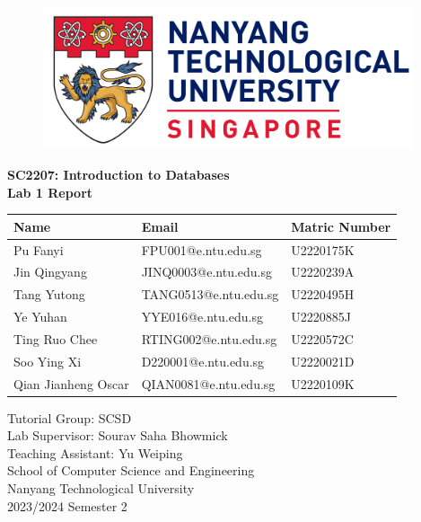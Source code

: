 \begin{titlepage}
	\begin{figure}[!t]
		\centering
		\includegraphics[width = 4.3in]{title/logo.pdf}
		\caption*{}
	\end{figure}
	
	\centering
	\LARGE{\textbf{SC2207: Introduction to Databases}}\\[0.2in]
	\LARGE{\textbf{Lab 1 Report}}\\[1.5in]
	

	\begin{table}[h]
		\centering
		\begin{tabular}{lll}
			\toprule
			\textbf{Name} & \textbf{Email} & \textbf{Matric Number} \\
			\midrule
			Pu Fanyi & FPU001@e.ntu.edu.sg & U2220175K \\
			Jin Qingyang & JINQ0003@e.ntu.edu.sg & U2220239A \\
			Tang Yutong & TANG0513@e.ntu.edu.sg & U2220495H \\
			Ye Yuhan & YYE016@e.ntu.edu.sg & U2220885J \\
			Ting Ruo Chee & RTING002@e.ntu.edu.sg & U2220572C \\
			Soo Ying Xi & D220001@e.ntu.edu.sg & U2220021D \\
			Qian Jianheng Oscar & QIAN0081@e.ntu.edu.sg & U2220109K \\
			\bottomrule
		\end{tabular}
	\end{table}

	\large{Tutorial Group: SCSD}\\
	\large{Lab Supervisor: Sourav Saha Bhowmick}\\
	\large{Teaching Assistant: Yu Weiping}\\[0.5in]
	
	
	\Large{School of Computer Science and Engineering}\\
	\Large{Nanyang Technological University}\\[0.3in]
	
	
	\Large{2023/2024 Semester 2}
	\newpage
\end{titlepage}